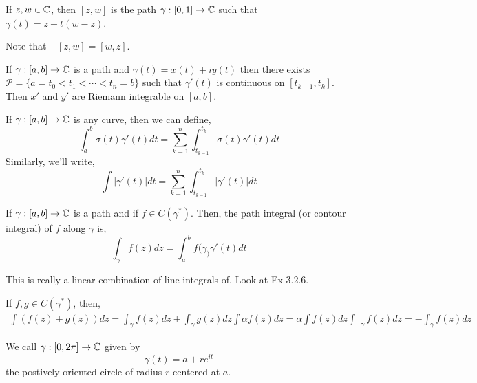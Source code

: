 \documentclass[12pt]{amsart}
\begin{document}
\begin{definition}
    If $z, w \in \mathbb C$, then $[z, w]$ is the path $\gamma: [0,1] \to \mathbb C$ such that $\gamma(t) = z+t(w-z)$. 
\end{definition}

\begin{remark}
    Note that $-[z, w] = [w, z]$. 
\end{remark}

\begin{remark}
    If $\gamma: [a,b] \to \mathbb C$ is a path and $\gamma(t) = x(t) + iy(t)$ then there exists $\mathscr P = \{a = t_0 < t_1 < \cdots < t_n = b\}$ such that $\gamma'(t)$ is continuous on $[t_{k-1}, t_k]$. Then $x'$ and $y'$ are Riemann integrable on $[a,b]$. 
\end{remark}

\begin{definition}
    If $\gamma: [a,b] \to \mathbb C$ is any curve, then we can define, 
    \[ \int_a^b \sigma(t)\gamma'(t)dt = \sum_{k=1}^n \int_{t_{k-1}}^{t_k} \sigma(t)\gamma'(t)dt \]
    Similarly, we'll write, 
    \[ \int |\gamma'(t)|dt = \sum_{k=1}^n \int_{t_{k-1}}^{t_k} |\gamma'(t)|dt\]
\end{definition}

\begin{definition}
    If $\gamma: [a,b] \to \mathbb C$ is a path and if $f \in C(\gamma^*)$. Then, the path integral (or contour integral) of $f$ along $\gamma$ is, 
    \[ \int_\gamma f(z)dz = \int_a^b f(\gamma_)\gamma'(t)dt \]
\end{definition}

This is really a linear combination of line integrals of. Look at Ex 3.2.6. 

If $f,g \in C(\gamma^*)$, then,
\begin{align*}
    \int (f(z)+g(z))dz = \int_\gamma f(z)dz + \int_\gamma g(z)dz 
    \int \alpha f(z)dz = \alpha \int f(z)dz  
    \int_{-\gamma} f(z)dz = -\int_\gamma f(z)dz
\end{align*}

\begin{remark}
    We call $\gamma: [0, 2\pi] \to \mathbb C$ given by 
    \[ \gamma(t) = a + re^{it}\]
    the postively oriented circle of radius $r$ centered at $a$. 
\end{remark}
\end{document}
